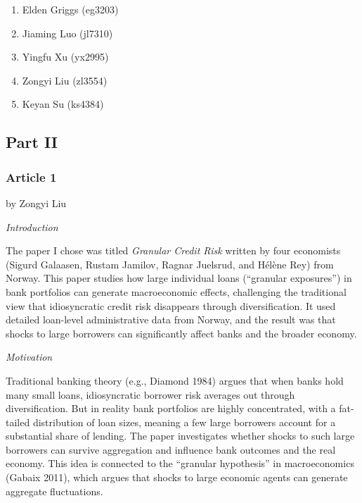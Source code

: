 \documentclass[letterpaper]{article}
\begin{document}
		\begin{enumerate}
			\item Elden Griggs (eg3203)
			\item Jiaming Luo (jl7310)
			\item Yingfu Xu (yx2995)
			\item Zongyi Liu (zl3554)
			\item Keyan Su (ks4384)
			
		\end{enumerate}
		
		\subsection{Part II}
		
		\subsubsection{Article 1}
		
		{\color{deepred} by Zongyi Liu}
		
		
		\textit{Introduction}
		
		The paper I chose was titled \textit{Granular Credit Risk} written by four economists (Sigurd Galaasen, Rustam Jamilov, Ragnar Juelsrud, and H\'{e}l\`{e}ne Rey) from Norway. This paper studies how large individual loans (``granular exposures'') in bank portfolios can generate macroeconomic effects, challenging the traditional view that idiosyncratic credit risk disappears through diversification. It used detailed loan-level administrative data from Norway, and the result was that shocks to large borrowers can significantly affect banks and the broader economy.
		
		\medskip
		
		\textit{Motivation}
		
		Traditional banking theory (e.g., Diamond 1984) argues that when banks hold many small loans, idiosyncratic borrower risk averages out through diversification. But in reality bank portfolios are highly concentrated, with a fat-tailed distribution of loan sizes, meaning a few large borrowers account for a substantial share of lending. The paper investigates whether shocks to such large borrowers can survive aggregation and influence bank outcomes and the real economy. This idea is connected to the ``granular hypothesis'' in macroeconomics (Gabaix 2011), which argues that shocks to large economic agents can generate aggregate fluctuations.
		
		\medskip
		
\end{document}
